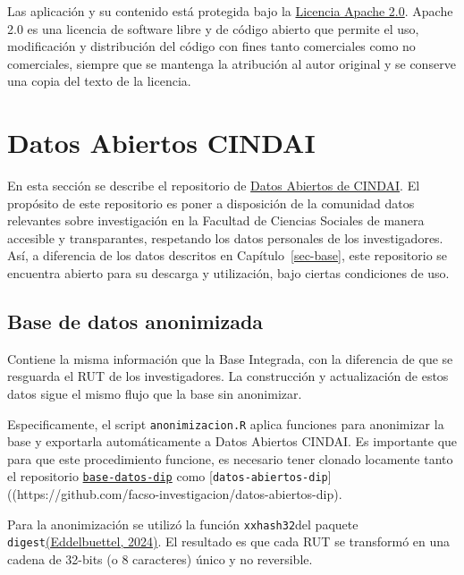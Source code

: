 \documentclass[
  spanish,
  letterpaper,
  DIV=11,
  numbers=noendperiod]{scrreprt}
\begin{document}
Las aplicación y su contenido está protegida bajo la
\href{https://www.apache.org/licenses/LICENSE-2.0}{Licencia Apache 2.0}.
Apache 2.0 es una licencia de software libre y de código abierto que
permite el uso, modificación y distribución del código con fines tanto
comerciales como no comerciales, siempre que se mantenga la atribución
al autor original y se conserve una copia del texto de la licencia.


\chapter{Datos Abiertos CINDAI}\label{sec-abiertos}

En esta sección se describe el repositorio de
\href{https://github.com/facso-investigacion/datos-abiertos-dip/tree/main}{Datos
Abiertos de CINDAI}. El propósito de este repositorio es poner a
disposición de la comunidad datos relevantes sobre investigación en la
Facultad de Ciencias Sociales de manera accesible y transparantes,
respetando los datos personales de los investigadores. Así, a diferencia
de los datos descritos en Capítulo~\ref{sec-base}, este repositorio se
encuentra abierto para su descarga y utilización, bajo ciertas
condiciones de uso.

\section{Base de datos anonimizada}\label{base-de-datos-anonimizada}

Contiene la misma información que la Base Integrada, con la diferencia
de que se resguarda el RUT de los investigadores. La construcción y
actualización de estos datos sigue el mismo flujo que la base sin
anonimizar.

Especificamente, el script \texttt{anonimizacion.R} aplica funciones
para anonimizar la base y exportarla automáticamente a Datos Abiertos
CINDAI. Es importante que para que este procedimiento funcione, es
necesario tener clonado locamente tanto el repositorio
\href{https://github.com/facso-investigacion/bases-datos-dip}{\texttt{base-datos-dip}}
como
{[}\texttt{datos-abiertos-dip}{]}((https://github.com/facso-investigacion/datos-abiertos-dip).

Para la anonimización se utilizó la función \texttt{xxhash32}del paquete
\texttt{digest}\href{https://dirk.eddelbuettel.com/code/digest.html}{(Eddelbuettel,
2024)}. El resultado es que cada RUT se transformó en una cadena de
32-bits (o 8 caracteres) único y no reversible.
\end{document}
